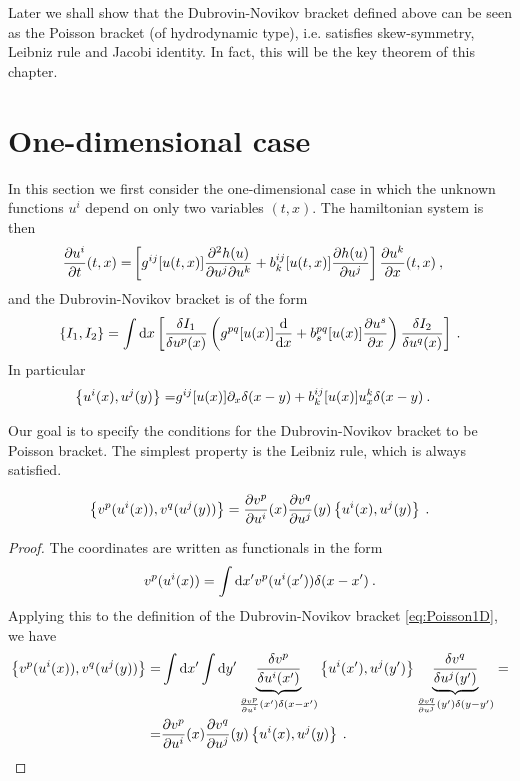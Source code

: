 Later we shall show that the Dubrovin-Novikov bracket defined above can be seen as the Poisson bracket (of hydrodynamic type), i.e. satisfies  skew-symmetry, Leibniz rule and Jacobi identity. In fact, this will be the key theorem of this chapter.

\section{One-dimensional case}

In this section we first consider the one-dimensional case in which the unknown functions $u^i$ depend on only two variables $(t,x)$. The hamiltonian system is then
\begin{align}
    \frac{\partial u^i}{\partial t} (t,x) =&
    \left[ g^{ij} [u(t,x)] \frac{\partial^2 h(u)}{\partial u^j \partial u^k} + b_k^{ij} [u(t,x)] \frac{\partial h(u)}{\partial u^j} \right] \frac{\partial u^k}{\partial x}(t,x) \:, 
\end{align}
and the Dubrovin-Novikov bracket is of the form
\begin{align}
    \left \lbrace I_1,I_2 \right \rbrace = \int \mathrm{d} x
    \left[ \frac{\delta I_1}{\delta u^p(x)} \left( g^{pq}[u(x)] \frac{\mathrm{d}}{\mathrm{d}x} + b^{pq}_s[u(x)] \frac{\partial u^s}{\partial x} \right) \frac{\delta I_2}{\delta u^q(x)} \right] \:. \label{eq:Dubrovin-Novikov bracket 1D}
\end{align}
In particular
\begin{align}
    \label{eq:Poisson1D}
    \left \lbrace u^i(x), u^j(y) \right \rbrace =& g^{ij} [u(x)] \partial_x \delta(x-y) + b_k^{ij} [u(x)] u^k_x \delta(x-y) \:. 
\end{align}

Our goal is to specify the conditions for the Dubrovin-Novikov bracket to be Poisson bracket. The simplest property is the Leibniz rule, which is always satisfied.

\begin{proposition}
    \begin{align}
        \label{eq:transformace-zavorka}
        \left \lbrace v^p(u^i(x)),v^q(u^j(y)) \right \rbrace = \frac{\partial v^p}{\partial u^i}(x) \frac{\partial v^q}{\partial u^j}(y) \left \lbrace u^i(x),u^j(y) \right \rbrace \:. 
    \end{align}
\end{proposition}
\begin{proof}
    The coordinates are written as functionals in the form
    \begin{align}
        v^p(u^i(x)) = \int \mathrm{d} x' v^p(u^i(x')) \delta (x-x') \:.
    \end{align}
    Applying this to the definition of the Dubrovin-Novikov bracket \eqref{eq:Poisson1D}, we have
    \begin{align}
        \left \lbrace v^p(u^i(x)),v^q(u^j(y)) \right \rbrace 
        =& \int \mathrm{d} x' \int \mathrm{d} y' \underbrace{\frac{\delta v^p}{\delta u^i(x')} }_{\frac{\partial v^p}{\partial u^i}(x') \delta(x-x')} \left \lbrace u^i(x'),u^j(y') \right \rbrace \underbrace{\frac{\delta v^q}{\delta u^j(y')} }_{\frac{\partial v^q}{\partial u^j}(y') \delta(y-y')}
        = \\ =& \frac{\partial v^p}{\partial u^i}(x) \frac{\partial v^q}{\partial u^j}(y) \left \lbrace u^i(x),u^j(y) \right \rbrace \:.
    \end{align}
\end{proof}

